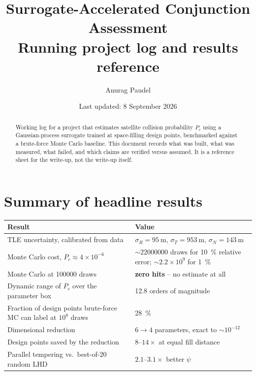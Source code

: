 \documentclass[11pt]{article}
\title{Surrogate-Accelerated Conjunction Assessment\\
       \large Running project log and results reference}
\author{Anurag Paudel}
\date{Last updated: 8 September 2026}
\newcommand{\Pc}{P_c}
\begin{document}
\maketitle

\begin{abstract}
Working log for a project that estimates satellite collision probability
$\Pc$ using a Gaussian-process surrogate trained at space-filling design
points, benchmarked against a brute-force Monte Carlo baseline. This
document records what was built, what was measured, what failed, and which
claims are verified versus assumed. It is a reference sheet for the
write-up, not the write-up itself.
\end{abstract}

\tableofcontents

\section{Summary of headline results}\label{sec:headline}

\begin{longtable}{p{} p{}}
\toprule
\textbf{Result} & \textbf{Value} \\
\midrule
\endhead
TLE uncertainty, calibrated from data &
  $\sigma_R = \SI{95}{\meter}$, $\sigma_T = \SI{953}{\meter}$,
  $\sigma_N = \SI{143}{\meter}$ \\
Monte Carlo cost, $\Pc \approx 4\times10^{-6}$ &
  $\sim$\num{22000000} draws for \SI{10}{\percent} relative error;
  $\sim2.2\times10^{9}$ for \SI{1}{\percent} \\
Monte Carlo at \num{100000} draws & \textbf{zero hits} -- no estimate at all \\
Dynamic range of $\Pc$ over the parameter box & \num{12.8} orders of magnitude \\
Fraction of design points brute-force MC can label at $10^8$ draws &
  \SI{28}{\percent} \\
Dimensional reduction & $6 \to 4$ parameters, exact to $\sim10^{-12}$ \\
Design points saved by the reduction & $8$--$14\times$ at equal fill distance \\
Parallel tempering vs.\ best-of-20 random LHD & $2.1$--$3.1\times$ better $\psi$ \\
\bottomrule
\end{longtable}

\end{document}
